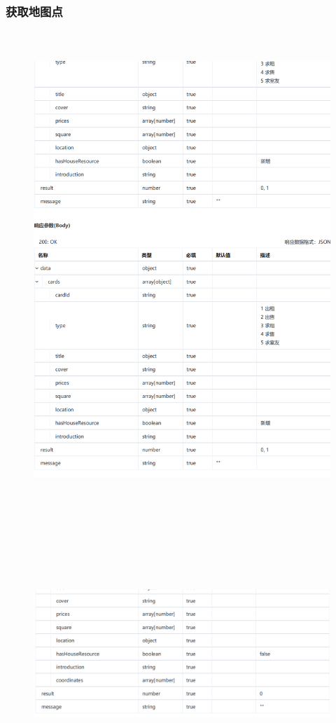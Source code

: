         \subsubsection{获取地图点}        
        \begin{figure}[h]
            \centering
            \includegraphics[height=18.0cm,width=14.0cm]{design/image/api6.png} 
            \end{figure}    
    \newpage     
    \begin{figure}[h]
        \centering
        \includegraphics[height=10.0cm,width=14.0cm]{design/image/api7.png} 
        \end{figure}    
\newpage   
